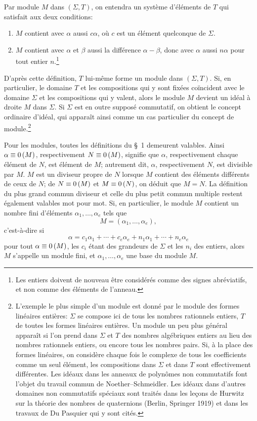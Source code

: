 Par module $M$ dans $(\Sigma,T)$, on entendra un système d'éléments de $T$ qui satisfait aux deux conditions:
\begin{enumerate}
\item $M$ contient avec $\alpha$ aussi $c\alpha$, où $c$ est un élément quelconque de $\Sigma$.
\item $M$ contient avec $\alpha$ et $\beta$ aussi la différence $\alpha-\beta$, donc avec $\alpha$ aussi $n\alpha$ pour tout entier $n$.\footnote{Les entiers doivent de nouveau être considérés comme des signes abréviatifs, et non comme des éléments de l'anneau.}
\end{enumerate}
D'après cette définition, $T$ lui-même forme un module dans $(\Sigma,T)$. Si, en particulier, le domaine $T$ et les compositions qui y sont fixées coïncident avec le domaine $\Sigma$ et les compositions qui y valent, alors le module $M$ devient un idéal à droite $M$ dans $\Sigma$. Si $\Sigma$ est en outre supposé commutatif, on obtient le concept ordinaire d'idéal, qui apparaît ainsi comme un cas particulier du concept de module.\footnote{L'exemple le plus simple d'un module est donné par le module des formes linéaires entières: $\Sigma$ se compose ici de tous les nombres rationnels entiers, $T$ de toutes les formes linéaires entières. Un module un peu plus général apparaît si l'on prend dans $\Sigma$ et $T$ des nombres algébriques entiers au lieu des nombres rationnels entiers, ou encore tous les nombres pairs. Si, à la place des formes linéaires, on considère chaque fois le complexe de tous les coefficients comme un seul élément, les compositions dans $\Sigma$ et dans $T$ sont effectivement différentes. Les idéaux dans les anneaux de polynômes non commutatifs font l'objet du travail commun de Noether--Schmeidler. Les idéaux dans d'autres domaines non commutatifs spéciaux sont traités dans les leçons de Hurwitz sur la théorie des nombres de quaternions (Berlin, Springer 1919) et dans les travaux de Du Pasquier qui y sont cités.}

Pour les modules, toutes les définitions du \S~1 demeurent valables. Ainsi $\alpha\equiv 0\,(M)$, respectivement $N\equiv 0\,(M)$, signifie que $\alpha$, respectivement chaque élément de $N$, est élément de $M$; autrement dit, $\alpha$, respectivement $N$, est divisible par $M$. $M$ est un diviseur propre de $N$ lorsque $M$ contient des éléments différents de ceux de $N$; de $N\equiv 0\,(M)$ et $M\equiv 0\,(N)$, on déduit que $M=N$. La définition du plus grand commun diviseur et celle du plus petit commun multiple restent également valables mot pour mot. Si, en particulier, le module $M$ contient un nombre fini d'éléments $\alpha_1,\ldots,\alpha_e$ tels que
\[
 M=(\alpha_1,
 \ldots,\alpha_e),
\]
c'est-à-dire si
\[
 \alpha=c_1\alpha_1+\cdots+c_e\alpha_e
       +n_1\alpha_1+\cdots+n_e\alpha_e
\]
pour tout $\alpha\equiv 0\,(M)$, les $c_i$ étant des grandeurs de $\Sigma$ et les $n_i$ des entiers, alors $M$ s'appelle un module fini, et $\alpha_1,\ldots,\alpha_e$ une base du module $M$.

